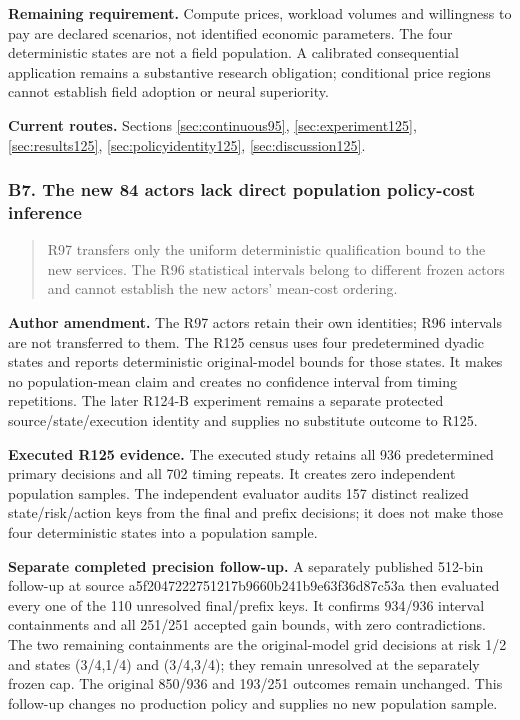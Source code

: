 \noindent\textbf{Remaining requirement.} Compute prices, workload volumes and willingness to pay are declared scenarios, not identified economic parameters. The four deterministic states are not a field population. A calibrated consequential application remains a substantive research obligation; conditional price regions cannot establish field adoption or neural superiority.

\noindent\textbf{Current routes.} Sections \ref{sec:continuous95}, \ref{sec:experiment125}, \ref{sec:results125}, \ref{sec:policyidentity125}, \ref{sec:discussion125}.

\subsubsection{B7. The new 84 actors lack direct population policy-cost inference}

\begin{quote}\small
R97 transfers only the uniform deterministic qualification bound to the new services. The R96 statistical intervals belong to different frozen actors and cannot establish the new actors' mean-cost ordering.
\end{quote}

\noindent\textbf{Author amendment.} The R97 actors retain their own identities; R96 intervals are not transferred to them. The R125 census uses four predetermined dyadic states and reports deterministic original-model bounds for those states. It makes no population-mean claim and creates no confidence interval from timing repetitions. The later R124-B experiment remains a separate protected source/state/execution identity and supplies no substitute outcome to R125.

\noindent\textbf{Executed R125 evidence.} The executed study retains all 936 predetermined primary decisions and all 702 timing repeats. It creates zero independent population samples. The independent evaluator audits 157 distinct realized state/risk/action keys from the final and prefix decisions; it does not make those four deterministic states into a population sample.

\noindent\textbf{Separate completed precision follow-up.} A separately published 512-bin follow-up at source a5f2047222751217b9660b241b9e63f36d87c53a then evaluated every one of the 110 unresolved final/prefix keys. It confirms 934/936 interval containments and all 251/251 accepted gain bounds, with zero contradictions. The two remaining containments are the original-model grid decisions at risk 1/2 and states (3/4,1/4) and (3/4,3/4); they remain unresolved at the separately frozen cap. The original 850/936 and 193/251 outcomes remain unchanged. This follow-up changes no production policy and supplies no new population sample.

